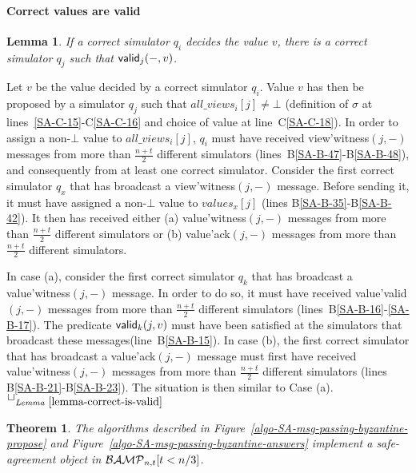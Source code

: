 \documentclass[11pt,letterpaper]{article}
\newtheorem{theorem}{Theorem}
\newtheorem{lemma}{Lemma}
\newlength {\afterproof}
\newcommand{\toto}{xxx}
\newenvironment{proofL}{\noindent{\bf Proof }}
{\hspace*{\fill}$\Box_{\mathit{Lemma}~\ref{\toto}}$\par\vspace{\afterproof}}
\newcommand{\BM}{{\cal BAMP}_{n,t}}
\begin{document}
\paragraph{Correct values are valid}
\begin{lemma}
\label{lemma-correct-is-valid}
If a correct simulator $q_i$ decides the value $v$, there is 
a correct simulator $q_j$ such that ${\sf valid}_j(-,v)$.
\end{lemma}
\begin{proofL}


Let $v$ be the value decided by a correct simulator $q_i$. Value $v$ has
then be proposed by a simulator $q_j$ such that $all\_views_i[j]\neq \bot$
(definition of $\sigma$ at lines~\ref{SA-C-15}-C\ref{SA-C-16} 
and choice of value at 
line~C\ref{SA-C-18}). In order to assign a non-$\bot$ value to 
$all\_views_i[j]$, $q_i$ must have received {\sc view'witness}$(j,-)$
messages from more than $\frac{n+t}{2}$ different  simulators 
(lines~B\ref{SA-B-47}-B\ref{SA-B-48}), and 
consequently from at least one correct 
simulator. Consider the first correct simulator $q_x$ that has broadcast a
{\sc view'witness}$(j,-)$ message. Before sending it, it must have assigned 
a non-$\bot$ value to $values_x[j]$ (lines B\ref{SA-B-35}-B\ref{SA-B-42}).
It then has received either (a) {\sc value'witness}$(j,-)$ messages from 
more than $\frac{n+t}{2}$ different  simulators or 
(b) {\sc value'ack}$(j,-)$ messages from more than $\frac{n+t}{2}$ different  
simulators.

In case (a), consider the first correct simulator $q_k$ that has 
broadcast a {\sc value'witness}$(j,-)$ message. In order to do so, 
it must have received {\sc value'valid}$(j,-)$ messages from more 
than $\frac{n+t}{2}$ different  
simulators (lines~B\ref{SA-B-16}-\ref{SA-B-17}).
The predicate ${\sf valid}_k(j,v)$ must have been satisfied at the 
simulators that broadcast these messages(line~B\ref{SA-B-15}). 
In case (b), the first correct simulator  that has 
broadcast a {\sc value'ack}$(j,-)$ message must first have received 
{\sc value'witness}$(j,-)$ messages from more than $\frac{n+t}{2}$ 
different  simulators (lines B\ref{SA-B-21}-B\ref{SA-B-23}). 
The situation is then similar to Case (a).
\renewcommand{\toto}{lemma-correct-is-valid}
\end{proofL}


\begin{theorem}
\label{theorem-SA-object-is-correct}
The algorithms described in 
Figure~{\em\ref{algo-SA-msg-passing-byzantine-propose}} and 
 Figure~{\em\ref{algo-SA-msg-passing-byzantine-answers}} implement a 
safe-agreement object in  $\BM[t<n/3]$.
\end{theorem}
\end{document}
